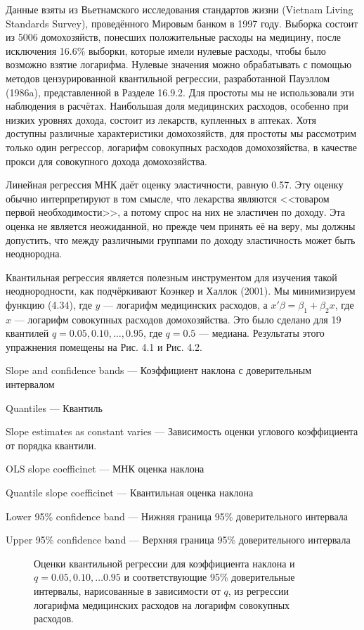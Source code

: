 Данные взяты из Вьетнамского исследования стандартов жизни (Vietnam Living Standards Survey), проведённого Мировым банком в 1997 году. Выборка состоит из 5006 домохозяйств, понесших положительные расходы на медицину, после исключения 16.6\% выборки, которые имели нулевые расходы, чтобы было возможно взятие логарифма. Нулевые значения можно обрабатывать с помощью методов цензурированной квантильной регрессии, разработанной Пауэллом (1986a), представленной в Разделе 16.9.2. Для простоты мы не использовали эти наблюдения в расчётах. Наибольшая доля медицинских расходов, особенно при низких уровнях дохода, состоит из лекарств, купленных в аптеках. Хотя доступны различные характеристики домохозяйств, для простоты мы рассмотрим только один регрессор, логарифм совокупных расходов домохозяйства, в качестве прокси для  совокупного дохода домохозяйства. 

Линейная регрессия МНК даёт оценку эластичности, равную 0.57. Эту оценку обычно интерпретируют в том смысле, что лекарства являются <<товаром первой необходимости>>, а потому спрос на них не эластичен по доходу. Эта оценка не является неожиданной, но прежде чем принять её на веру, мы должны допустить, что между различными группами по доходу эластичность может быть неоднородна.

Квантильная регрессия является полезным инструментом для изучения такой неоднородности, как подчёркивают Коэнкер и Халлок (2001). Мы минимизируем функцию (4.34), где $y$ --- логарифм медицинских расходов, а $x'\beta = \beta_1 +\beta_2 x$, где $x$ --- логарифм совокупных расходов домохозяйства. Это было сделано для 19 квантилей $q = {0.05, 0.10,\ldots , 0.95}$, где $q = 0.5$ --- медиана. Результаты этого упражнения помещены на Рис. 4.1 и Рис. 4.2. 


Slope and confidence bands --- Коэффициент наклона с доверительным интервалом

Quantiles --- Квантиль

Slope estimates as constant varies --- Зависимость оценки углового коэффициента от порядка квантили.

OLS slope coefficinet --- МНК оценка наклона

Quantile slope coefficinet --- Квантильная оценка наклона

Lower 95\% confidence band --- Нижняя граница 95\% доверительного интервала

Upper 95\% confidence band --- Верхняя граница 95\% доверительного интервала


\begin{figure}[t]
 \caption{Оценки квантильной регрессии для коэффициента наклона и $q = 0.05,0.10,\ldots 0.95$ и соответствующие 95\% доверительные интервалы, нарисованные в зависимости от $q$, из регрессии логарифма медицинских расходов на логарифм совокупных расходов.}
\end{figure}


